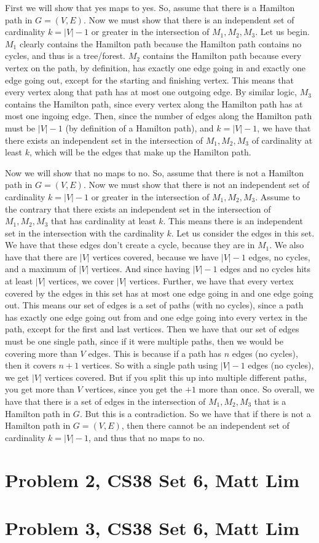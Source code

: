 \documentclass{article}
\begin{document}
First we will show that yes maps to yes. So, assume that there is a Hamilton
path in $G = (V,E)$. Now we must show that there is an independent set of cardinality $k =
|V| - 1$ or greater in the intersection of $M_1,M_2,M_3$. Let us begin. $M_1$ clearly contains the Hamilton
path because the Hamilton path contains no cycles, and thus is a tree/forest.
$M_2$ contains the Hamilton path because every vertex on the path, by
definition, has exactly one edge going in and exactly one edge going out, except
for the starting and finishing vertex. This means that every vertex along that
path has at most one outgoing edge. By similar logic, $M_3$ contains the
Hamilton path, since every vertex along the Hamilton path has at most one
ingoing edge. Then, since the number of edges along the Hamilton path must be
$|V| - 1$ (by definition of a Hamilton path),
and $k = |V| - 1$, we have that there exists an independent set
in the intersection of $M_1,M_2,M_3$ of cardinality at least $k$, which will be
the edges that make up the Hamilton path.

Now we will show that no maps to no. So, assume that there is not a Hamilton
path in $G = (V,E)$. Now we must show that there is not an independent set of
cardinality $k = |V| - 1$ or greater in the intersection of $M_1, M_2, M_3$. Assume to the
contrary that there exists an independent set in the intersection of
$M_1,M_2,M_3$ that has cardinality at least $k$. This means there is an
independent set in the intersection with the cardinality $k$. Let us consider
the edges in this set.  We have that
these edges don't create a cycle, because they are in $M_1$. We also have that
there are $|V|$ vertices covered, because we have $|V| - 1$ edges, no cycles, and a
maximum of $|V|$ vertices. And since having $|V| - 1$ edges and no cycles hits
at least $|V|$ vertices, we cover $|V|$ vertices. Further, we have that every
vertex covered by the edges in this set has at most one edge going in and one edge going out.
This means our set of edges is a set of paths (with no cycles), since a path has exactly one edge
going out from and one edge going into every vertex in the path, except for the
first and last vertices. Then we have that our set of
edges must be one single path, since if it were multiple paths, then we would
be covering more than $V$ edges. This is because if a path has $n$ edges (no
cycles), then it covers $n+1$ vertices. So with a single path using $|V| - 1$
edges (no cycles), we get
$|V|$ vertices covered. But if you split this up into multiple different paths, you
get more than $V$ vertices, since you get the $+1$ more than once. So overall,
we have that there is a set of edges in the intersection of $M_1,M_2,M_3$ that
is a Hamilton path in $G$. But this is a contradiction. So we have that if there
is not a Hamilton path in $G = (V,E)$, then there cannot be an independent set
of cardinality $k = |V| - 1$, and thus that no maps to no.
\newpage

\section*{Problem 2, CS38 Set 6, Matt Lim}
\newpage

\section*{Problem 3, CS38 Set 6, Matt Lim}
\newpage

\end{document}
